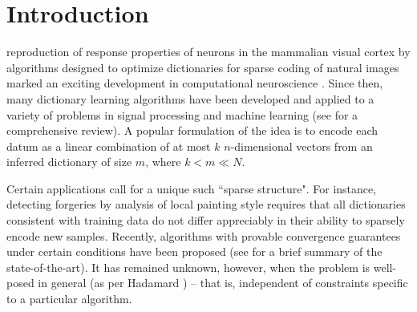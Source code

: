 \documentclass[journal, twocolumn]{IEEEtran}
\begin{document}
\section{Introduction}\label{Intro}
 reproduction of response properties of neurons in the mammalian visual cortex by algorithms designed to optimize dictionaries for sparse coding of natural images marked an exciting development in computational neuroscience \cite{Olshausen96, hurri1996image, bell1997independent, van1998independent}. Since then, many dictionary learning algorithms have been developed and applied to a variety of problems in signal processing and machine learning (see \cite{Zhang15} for a comprehensive review). A popular formulation of the idea is to encode each datum as a linear combination of at most $k$ $n$-dimensional vectors from an inferred dictionary of size $m$, where $k < m \ll N$. 

Certain applications call for a unique such ``sparse structure". For instance, detecting forgeries by analysis of local painting style \cite{hughes2010, Olshausen10} requires that all dictionaries consistent with training data do not differ appreciably in their ability to sparsely encode new samples. Recently, algorithms with provable convergence guarantees under certain conditions have been proposed  (see \cite[Sec.~I-E]{Sun16} for a brief summary of the state-of-the-art). It has remained unknown, however, when the problem is well-posed in general (as per Hadamard \cite{Hadamard1902}) -- that is, independent of constraints specific to a particular algorithm.
\end{document}

